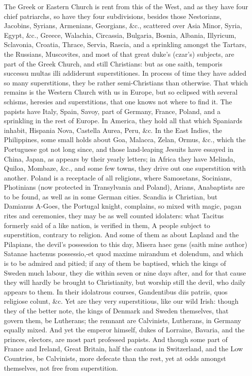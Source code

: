 {The Greek or Eastern Church is rent from this of the West, and as
they have four chief patriarchs, so have they four subdivisions,
besides those Nestorians, Jacobins, Syrians, Armenians, Georgians, \&c.,
scattered over Asia Minor, Syria, Egypt, \&c., Greece, Walachia,
Circassia, Bulgaria, Bosnia, Albania, Illyricum, Sclavonia, Croatia,
Thrace, Servia, Rascia, and a sprinkling amongst the Tartars, the
Russians, Muscovites, and most of that great duke's (czar's) subjects,
are part of the Greek Church, and still Christians: but as one
saith, temporis successu multas illi addiderunt superstitiones. In
process of time they have added so many superstitions, they be rather
semi-Christians than otherwise. That which remains is the Western
Church with us in Europe, but so eclipsed with several schisms,
heresies and superstitions, that one knows not where to find it. The
papists have Italy, Spain, Savoy, part of Germany, France, Poland, and
a sprinkling in the rest of Europe. In America, they hold all that
which Spaniards inhabit, Hispania Nova, Castella Aurea, Peru, \&c. In
the East Indies, the Philippines, some small holds about Goa, Malacca,
Zelan, Ormus, \&c., which the Portuguese got not long since, and those
land-leaping Jesuits have essayed in China, Japan, as appears by their
yearly letters; in Africa they have Melinda, Quiloa, Mombaze, \&c., and
some few towns, they drive out one superstition with another. Poland is
a receptacle of all religions, where Samosetans, Socinians, Photinians
(now protected in Transylvania and Poland), Arians, Anabaptists are to
be found, as well as in some German cities. Scandia is Christian, but
Damianus A-Goes, the Portugal knight, complains, so mixed with
magic, pagan rites and ceremonies, they may be as well counted
idolaters: what Tacitus formerly said of a like nation, is verified in
them, A people subject to superstition, contrary to religion. And
some of them as about Lapland and the Pilapians, the devil's possession
to this day, Misera haec gens (saith mine author) Satanae
hactenus possessio,-et quod maxime mirandum et dolendum, and which is
to be admired and pitied; if any of them be baptised, which the kings
of Sweden much labour, they die within seven or nine days after, and
for that cause they will hardly be brought to Christianity, but worship
still the devil, who daily appears to them. In their idolatrous
courses, Gandentibus diis patriis, quos religiose colunt, \&c. Yet are
they very superstitious, like our wild Irish: though they of the better
note, the kings of Denmark and Sweden themselves, that govern them, be
Lutherans; the remnant are Calvinists, Lutherans, in Germany equally
mixed. And yet the emperor himself, dukes of Lorraine, Bavaria, and the
princes, electors, are most part professed papists. And though some
part of France and Ireland, Great Britain, half the cantons in
Switzerland, and the Low Countries, be Calvinists, more defecate than
the rest, yet at odds amongst themselves, not free from superstition.

}
